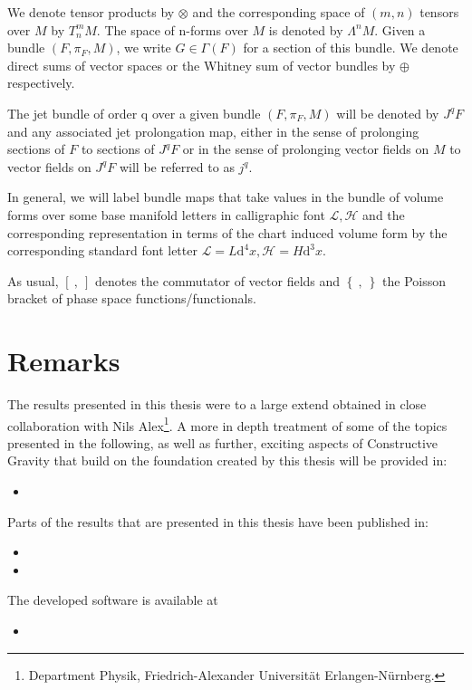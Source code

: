 \documentclass[a4paper,12pt, DIV=14, BCOR=5mm, twoside, headsepline, numbers=noenddot]{scrbook}
\begin{document}
We denote tensor products by $\otimes$ and the corresponding space of $(m,n)$ tensors over $M$ by $T^m_nM$. The space of n-forms over $M$ is denoted by $\Lambda^nM$. Given a bundle $(F,\pi_{F},M)$, we write $G \in \Gamma(F) $ for a section of this bundle. We denote direct sums of vector spaces or the Whitney sum of vector bundles by $\oplus$ respectively. 

The jet bundle of order q over a given bundle $(F,\pi_F,M)$ will be denoted by $J^qF$ and any associated jet prolongation map, either in the sense of prolonging sections of $F$ to sections of $J^qF$ or in the sense of prolonging vector fields on $M$ to vector fields on $J^qF$ will be referred to as $j^q$. 

In general, we will label bundle maps that take values in the bundle of volume forms over some base manifold letters in calligraphic font $\mathcal{L}, \mathcal{H}$ and the corresponding representation in terms of the chart induced volume form by the corresponding standard font letter $\mathcal{L}=L \mathrm{d}^4x, \mathcal{H}= H \mathrm{d}^3x$.

As usual, $\left[ \  ,   \  \right]$ denotes the commutator of vector fields and $\left \{  \  ,   \   \right \}$ the Poisson bracket of phase space functions/functionals. \\

\section*{Remarks}

The results presented in this thesis were to a large extend obtained in close collaboration with Nils Alex\footnote{Department Physik, Friedrich-Alexander Universität Erlangen-Nürnberg.}. 
A more in depth treatment of some of the topics presented in the following, as well as further, exciting aspects of Constructive Gravity that build on the foundation created by this thesis will be provided in:
\begin{itemize}
    \item {}
\end{itemize}
Parts of the results that are presented in this thesis have been published in:
\begin{itemize}
    \item {}
    \item {}
\end{itemize}
The developed software is available at
\begin{itemize}
    \item {}
\end{itemize}
\end{document}
